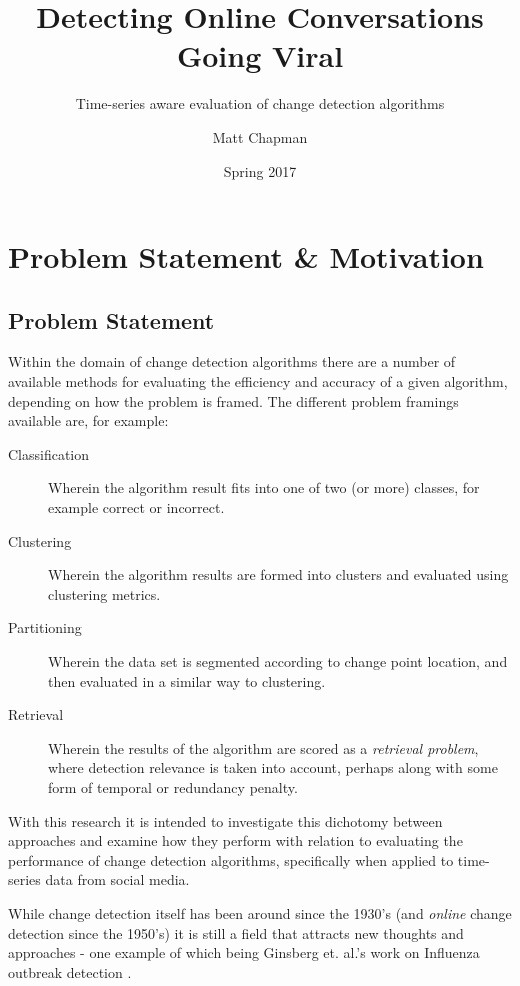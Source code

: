 \documentclass{uvamscse}	%
\title{Detecting Online Conversations Going Viral}
\subtitle{Time-series aware evaluation of change detection algorithms}
\date{Spring 2017}
\author{Matt Chapman}
\begin{document}
\nocite{*}
\maketitle


\chapter{Problem Statement \& Motivation}

\section{Problem Statement}

Within the domain of change detection algorithms there are a number of available methods for evaluating the efficiency and accuracy of a given algorithm, depending on how the problem is framed. The different problem framings available are, for example:

\begin{description}
	\item[Classification] Wherein the algorithm result fits into one of two (or more) classes, for example correct or incorrect.
	\item[Clustering] Wherein the algorithm results are formed into clusters and evaluated using clustering metrics.
	\item[Partitioning] Wherein the data set is segmented according to change point location, and then evaluated in a similar way to clustering.
	\item[Retrieval] Wherein the results of the algorithm are scored as a \emph{retrieval problem}, where detection relevance is taken into account, perhaps along with some form of temporal or redundancy penalty.
\end{description}

With this research it is intended to investigate this dichotomy between approaches and examine how they perform with relation to evaluating the performance of change detection algorithms, specifically when applied to time-series data from social media.

While change detection itself has been around since the 1930's (and \emph{online} change detection since the 1950's) it is still a field that attracts new thoughts and approaches - one example of which being Ginsberg et. al.'s work on Influenza outbreak detection \cite{Ginsberg2009}.
\end{document}
